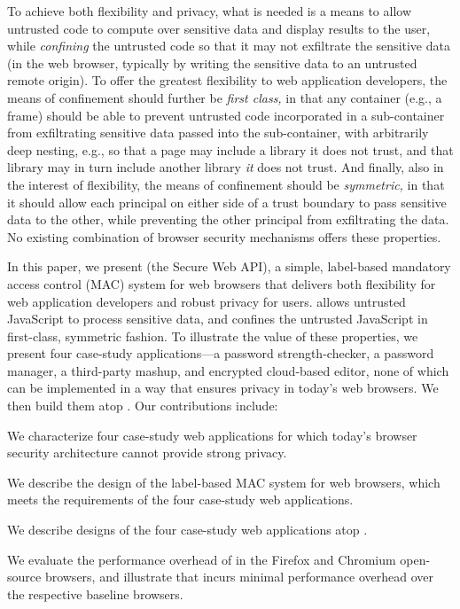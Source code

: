 To achieve both flexibility and privacy, what is needed is a means to
allow untrusted code to compute over sensitive data and display
results to  the user, while {\em confining} the untrusted code so that
it may not exfiltrate the sensitive data (in the web browser,
typically by writing the sensitive data to an untrusted remote
origin). To offer the greatest flexibility to web application
developers, the means of confinement should further be {\em first
  class,} in that any container (e.g., a frame) should be able
to prevent untrusted code incorporated in a sub-container from
exfiltrating sensitive data passed into the sub-container, with
arbitrarily deep nesting, e.g., so that a page may include a
library it does not trust, and that library may in turn include
another library {\em it} does not trust. And finally, also in the
interest of flexibility, the means of confinement should be {\em
  symmetric,} in that it should allow each principal on either side of
a trust boundary to pass sensitive data to the other, while preventing
the other principal from exfiltrating the data. No existing
combination of browser security mechanisms offers these properties.

In this paper, we present \sys{} (the Secure Web API), a simple,
label-based mandatory access control (MAC) system for web browsers
that delivers both flexibility for web application developers and
robust privacy for users. \sys{} allows untrusted JavaScript to
process sensitive data, and confines the untrusted JavaScript in
first-class, symmetric fashion. To illustrate the value of these
properties, we present four case-study applications---a password
strength-checker, a password manager, a third-party mashup, and
encrypted cloud-based editor, none of which can be implemented in a
way that ensures privacy in today's web browsers. We then build them
atop \sys. Our contributions include:

\begin{CompactItemize}
\item We characterize four case-study web applications for which
  today's browser security architecture cannot provide strong privacy.
\item We describe the design of the \sys{} label-based MAC system
  for web browsers, which meets the requirements of the four
  case-study web applications.
\item We describe designs of the four case-study web applications atop
  \sys.
\item We evaluate the performance overhead of \sys{} in the Firefox
  and Chromium open-source browsers, and illustrate that \sys{}
  incurs minimal performance overhead over the respective baseline
  browsers.
\end{CompactItemize}

